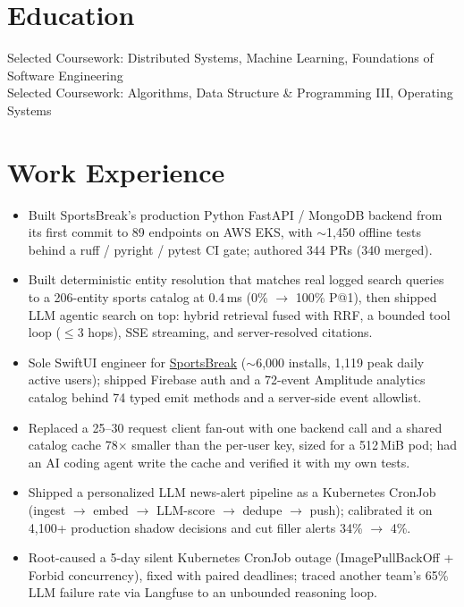 \documentclass[11pt, letterpaper]{article}
\begin{document}

\section{Education}
Selected Coursework: Distributed Systems, Machine Learning, Foundations of Software Engineering\\[1pt]
Selected Coursework: Algorithms, Data Structure \& Programming III, Operating Systems

\section{Work Experience}
\begin{itemize}
  \item Built SportsBreak's production Python FastAPI / MongoDB backend from its first commit to 89 endpoints on AWS EKS, with $\sim$1{,}450 offline tests behind a ruff / pyright / pytest CI gate; authored 344 PRs (340 merged).
  \item Built deterministic entity resolution that matches real logged search queries to a 206-entity sports catalog at 0.4\,ms (0\% $\to$ 100\% P@1), then shipped LLM agentic search on top: hybrid retrieval fused with RRF, a bounded tool loop ($\le$3 hops), SSE streaming, and server-resolved citations.
  \item Sole SwiftUI engineer for \href{https://apps.apple.com/app/id6762649287}{SportsBreak} ($\sim$6{,}000 installs, 1{,}119 peak daily active users); shipped Firebase auth and a 72-event Amplitude analytics catalog behind 74 typed emit methods and a server-side event allowlist.
  \item Replaced a 25--30 request client fan-out with one backend call and a shared catalog cache 78$\times$ smaller than the per-user key, sized for a 512\,MiB pod; had an AI coding agent write the cache and verified it with my own tests.
  \item Shipped a personalized LLM news-alert pipeline as a Kubernetes CronJob (ingest $\to$ embed $\to$ LLM-score $\to$ dedupe $\to$ push); calibrated it on 4{,}100+ production shadow decisions and cut filler alerts 34\% $\to$ 4\%.
  \item Root-caused a 5-day silent Kubernetes CronJob outage (ImagePullBackOff + Forbid concurrency), fixed with paired deadlines; traced another team's 65\% LLM failure rate via Langfuse to an unbounded reasoning loop.
\end{itemize}
\end{document}
